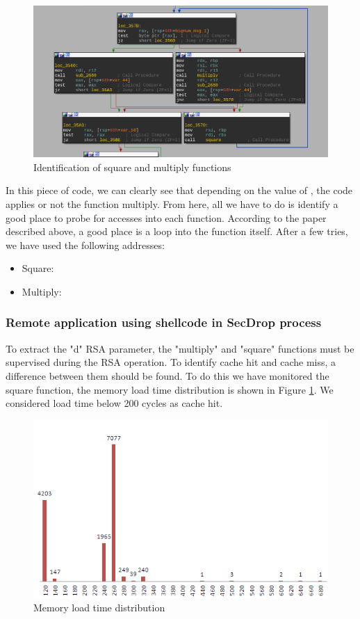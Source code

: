 \documentclass[a4paper]{article}
\begin{document}
\begin{figure}[H]
    \center
    \includegraphics[scale=0.45]{square_multiply}
    \caption{Identification of square and multiply functions}
\end{figure}

In this piece of code, we can clearly see that depending on the value of , the code applies or not the function multiply. 
From here, all we have to do is identify a good place to probe for accesses into each function. According to the paper described above, a good place is a loop into the function itself. After a few tries, we have used the following addresses: 
\begin{itemize}
\item Square: 
\item Multiply: 
\end{itemize}
\newpage
\subsubsection{Remote application using shellcode in SecDrop process}

To extract the "d" RSA parameter, the "multiply" and "square" functions must be supervised during the RSA operation.
To identify cache hit and cache miss, a difference between them should be found. To do this we have monitored the square function, the memory load time distribution is shown in Figure \ref{load-time-distribution}. We considered load time below 200 cycles as cache hit.


\begin{figure}[H]
    \center
    \includegraphics[scale=0.65]{load-time}
    \caption{Memory load time distribution}
    \label{load-time-distribution}
\end{figure}
\end{document}
